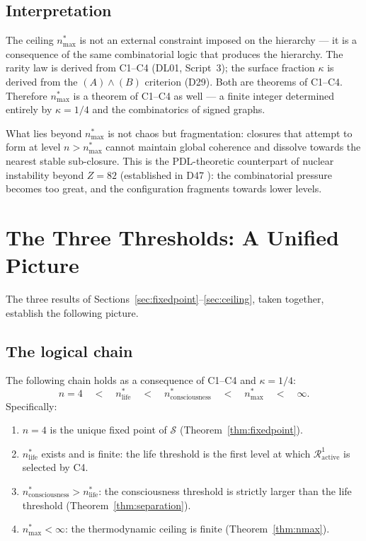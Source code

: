 \documentclass[12pt,a4paper]{article}
\newenvironment{theorembox}[1][]{%
  \begin{tcolorbox}[theoremstyle,title={Theorem%
    \ifx\relax#1\relax\else: #1\fi}]}{\end{tcolorbox}}
\theoremstyle{plain}
\theoremstyle{definition}
\theoremstyle{remark}
\newcommand{\Sop}{\mathcal{S}}
\newcommand{\Rop}{\mathcal{R}}
\newcommand{\kap}{\kappa}
\newcommand{\nlife}{n^{*}_{\mathrm{life}}}
\newcommand{\ncons}{n^{*}_{\mathrm{consciousness}}}
\newcommand{\nmax}{n^{*}_{\mathrm{max}}}
\begin{document}
\subsection{Interpretation}

The ceiling $\nmax$ is not an external constraint imposed on the hierarchy --- it is
a consequence of the same combinatorial logic that produces the hierarchy. The rarity
law is derived from C1--C4 (DL01, Script~3); the surface fraction $\kap$ is derived
from the $(A)\wedge(B)$ criterion (D29). Both are theorems of C1--C4. Therefore
$\nmax$ is a theorem of C1--C4 as well --- a finite integer determined entirely by
$\kap = 1/4$ and the combinatorics of signed graphs.

What lies beyond $\nmax$ is not chaos but fragmentation: closures that attempt to
form at level $n > \nmax$ cannot maintain global coherence and dissolve towards the
nearest stable sub-closure. This is the PDL-theoretic counterpart of nuclear
instability beyond $Z = 82$ (established in D47 \cite{D47}): the combinatorial
pressure becomes too great, and the configuration fragments towards lower levels.

\section{The Three Thresholds: A Unified Picture}
\label{sec:unified}

The three results of Sections~\ref{sec:fixedpoint}--\ref{sec:ceiling}, taken together,
establish the following picture.

\subsection{The logical chain}

\begin{theorembox}[Hierarchy of thresholds]
\label{thm:hierarchy}
The following chain holds as a consequence of C1--C4 and $\kap = 1/4$:
\begin{equation}
n = 4 \quad < \quad \nlife \quad < \quad \ncons \quad < \quad \nmax \quad < \quad \infty.
\end{equation}
Specifically:
\begin{enumerate}[leftmargin=2em]
\item $n = 4$ is the unique fixed point of $\Sop$ (Theorem~\ref{thm:fixedpoint}).
\item $\nlife$ exists and is finite: the life threshold is the first level at which
$\Rop^1_{\mathrm{active}}$ is selected by C4.
\item $\ncons > \nlife$: the consciousness threshold is strictly larger than the life
threshold (Theorem~\ref{thm:separation}).
\item $\nmax < \infty$: the thermodynamic ceiling is finite (Theorem~\ref{thm:nmax}).
\end{enumerate}
\end{theorembox}
\end{document}
